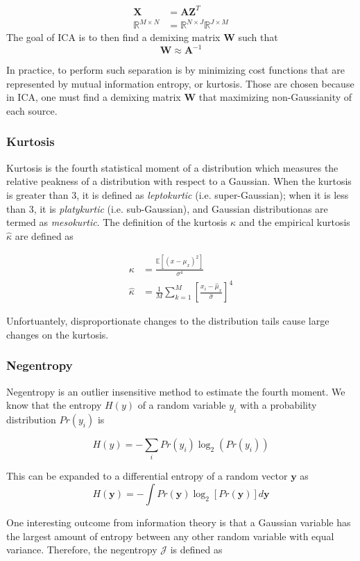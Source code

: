 \begin{align*}
    \bm{X} &= \bm{AZ}^T \\
    \mathbb{R}^{M\times N} &= \mathbb{R}^{N\times J} \mathbb{R}^{J\times M}
\end{align*}
The goal of ICA is to then find a demixing matrix $\bm{W}$ such that
$$\bm{W} \approx \bm{A}^{-1}$$

In practice, to perform such separation is by minimizing cost functions that are represented by mutual information entropy, or kurtosis. Those are chosen because in ICA, one must find a demixing matrix $\bm{W}$ that maximizing non-Gaussianity of each source.

\subsubsection{Kurtosis}
Kurtosis is the fourth statistical moment of a distribution which measures the relative peakness of a distribution with respect to a Gaussian. When the kurtosis is greater than 3, it is defined as \textit{leptokurtic} (i.e. super-Gaussian); when it is less than 3, it is \textit{platykurtic} (i.e. sub-Gaussian), and Gaussian distributionas are termed as \textit{mesokurtic}. The definition of the kurtosis $\kappa$ and the empirical kurtosis $\hat{\kappa}$ are defined as

\begin{align*}
    \kappa &= \frac{\mathbb{E}[(x-\mu_x)^2]}{\sigma^4} \\
    \hat{\kappa} &= \frac{1}{M} \sum_{k=1}^{M} \left[ \frac{x_i - \hat{\mu}_x}{\hat{\sigma}}\right]^4
\end{align*}

Unfortuantely, disproportionate changes to the distribution tails cause large changes on the kurtosis.

\subsubsection{Negentropy}
Negentropy is an outlier insensitive method to estimate the fourth moment. We know that the entropy $H(y)$ of a random variable $y_i$ with a probability distribution $Pr(y_i)$ is

$$H(y) = -\sum_i Pr(y_i) \log_2(Pr(y_i))$$

This can be expanded to a differential entropy of a random vector $\bm{y}$ as
$$H(\bm{y}) = - \int Pr(\bm{y}) \log_2 [Pr(\bm{y})] d\bm{y}$$

One interesting outcome from information theory is that a Gaussian variable has the largest amount of entropy between any other random variable with equal variance. Therefore, the negentropy $\mathcal{J}$ is defined as

